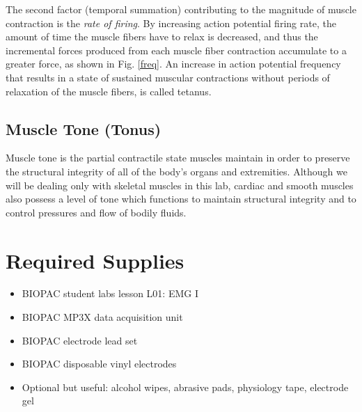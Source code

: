 \documentclass{article}
\begin{document}
The second factor (temporal summation) contributing to the magnitude of muscle contraction is the \textit{rate of firing}. By increasing action potential firing rate, the amount of time the muscle fibers have to relax is decreased, and thus the incremental forces produced from each muscle fiber contraction accumulate to a greater force, as shown in Fig. \ref{freq}. An increase in action potential frequency that results in a state of sustained muscular contractions without periods of relaxation of the muscle fibers, is called tetanus.

\subsection*{Muscle Tone (Tonus)}
Muscle tone is the partial contractile state muscles maintain in order to preserve the structural integrity of all of the body’s organs and extremities. Although we will be dealing only with skeletal muscles in this lab, cardiac and smooth muscles also possess a level of tone which functions to maintain structural integrity and to control pressures and flow of bodily fluids.

\section*{Required Supplies}
\begin{itemize}
	\item BIOPAC student labs lesson L01: EMG I
	\item BIOPAC MP3X data acquisition unit
	\item BIOPAC electrode lead set
	\item BIOPAC disposable vinyl electrodes
	\item Optional but useful: alcohol wipes, abrasive pads, physiology tape, electrode gel
\end{itemize}
\end{document}
